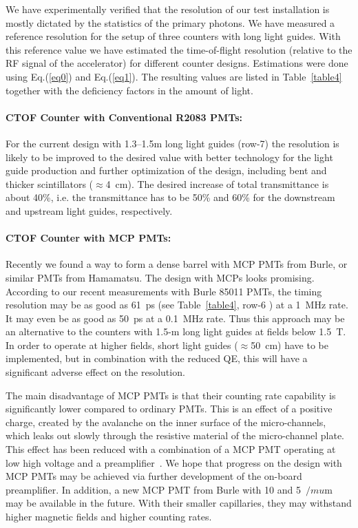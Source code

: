We have experimentally verified that the resolution of our test 
installation is mostly dictated by the statistics of the primary photons.  
We have measured a reference resolution for the setup of three counters with 
long light guides.  With this reference value we have estimated the 
time-of-flight resolution (relative to the RF signal of the accelerator) for 
different counter designs.  Estimations were done using Eq.(\ref{eq0}) and  
Eq.(\ref{eq1}).  The resulting values are listed in Table~\ref{table4} 
together with the deficiency factors in the amount of light.

\paragraph{CTOF Counter with Conventional R2083 PMTs:}

For the current design with 1.3--1.5m long light guides (row-7) the resolution 
is likely to be improved to the desired value with better technology for
the light guide production and further optimization of the design, including 
bent and thicker scintillators ($\approx$4~cm).  The desired increase of 
total transmittance is about 40\%, i.e. the transmittance has to be 50\% 
and 60\% for the downstream and upstream light guides, respectively.

\paragraph{CTOF Counter with MCP PMTs:}

Recently we found a way to form a dense barrel with MCP PMTs from Burle, 
or similar PMTs from Hamamatsu.  The design with MCPs looks promising. 
According to our recent measurements with Burle 85011 PMTs, the timing 
resolution may be as good as 61~ps (see Table~\ref{table4}, row-6 ) at a
1~MHz rate. It may even be as good as 50~ps at a 0.1~MHz rate.  Thus this 
approach may be an alternative to the counters with 1.5-m long light guides 
at fields below 1.5~T.  In order to operate at higher fields, short light 
guides ($\approx$50~cm) have to be implemented, but in combination with 
the reduced QE, this will have a significant adverse effect on the resolution. 

The main disadvantage of MCP PMTs is that their counting rate capability is 
significantly lower compared to ordinary PMTs.  This is an effect of a 
positive charge, created by the avalanche on the inner surface of the 
micro-channels, which leaks out slowly through the resistive material of 
the micro-channel plate.  This effect has been reduced with a combination of 
a MCP PMT operating at low high voltage and a preamplifier~\cite{Baturin:2005}.  
We hope that progress on the design with MCP PMTs may be achieved via further 
development of the on-board preamplifier.  In addition, a new MCP PMT from 
Burle with 10 and 5~$/mu$m may be available in the future.  With their smaller 
capillaries, they may withstand higher magnetic fields and higher counting rates. 


